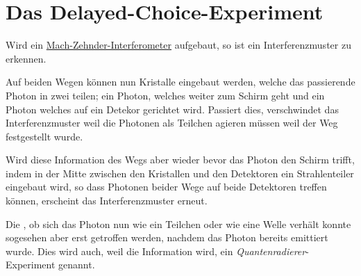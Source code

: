 \documentclass{article}
\begin{document}
\section{Das Delayed-Choice-Experiment}
Wird ein \hyperref[Mach-Zehnder-Interferometer]{Mach-Zehnder-Interferometer} aufgebaut, so ist ein Interferenzmuster zu erkennen.
 
Auf beiden Wegen können nun Kristalle eingebaut werden, welche das passierende Photon in zwei teilen; ein Photon, welches weiter zum Schirm geht und ein Photon welches auf ein Detekor gerichtet wird. Passiert dies, verschwindet das Interferenzmuster weil die Photonen als Teilchen agieren müssen weil der Weg festgestellt wurde.
 
Wird diese Information des Wegs aber wieder  bevor das Photon den Schirm trifft, indem in der Mitte zwischen den Kristallen und den Detektoren ein Strahlenteiler eingebaut wird, so dass Photonen beider Wege auf beide Detektoren treffen können, erscheint das Interferenzmuster erneut.
 
Die , ob sich das Photon nun wie ein Teilchen oder wie eine Welle verhält konnte sogesehen aber erst getroffen werden, nachdem das Photon bereits emittiert wurde. Dies wird auch, weil die Information  wird, ein \emph{Quantenradierer}-Experiment genannt. 
\end{document}
